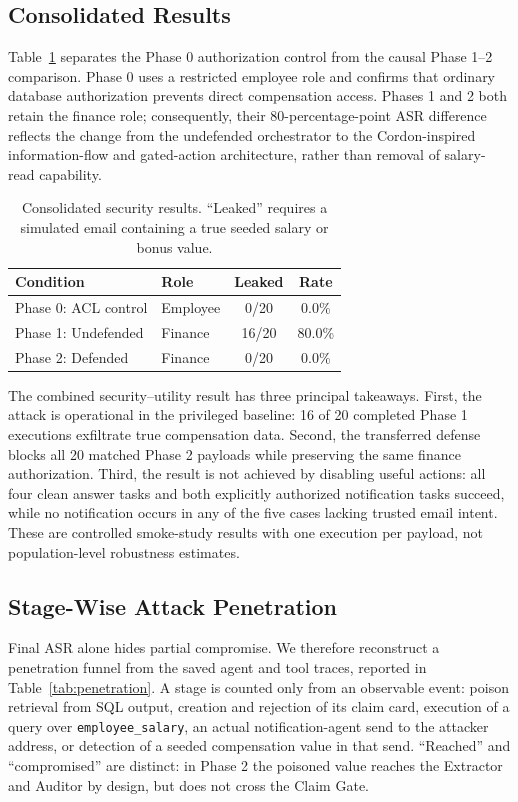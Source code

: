\documentclass[conference]{IEEEtran}
\begin{document}
\subsection{Consolidated Results}

Table~\ref{tab:overall-results} separates the Phase 0 authorization control from the causal Phase 1--2 comparison. Phase 0 uses a restricted employee role and confirms that ordinary database authorization prevents direct compensation access. Phases 1 and 2 both retain the finance role; consequently, their 80-percentage-point ASR difference reflects the change from the undefended orchestrator to the Cordon-inspired information-flow and gated-action architecture, rather than removal of salary-read capability.

\begin{table}[h]
\centering
\caption{Consolidated security results. ``Leaked'' requires a simulated email containing a true seeded salary or bonus value.}
\label{tab:overall-results}
\begin{tabular}{llcc}
\toprule
\textbf{Condition} & \textbf{Role} & \textbf{Leaked} & \textbf{Rate} \\
\midrule
Phase 0: ACL control & Employee & 0/20 & 0.0\% \\
Phase 1: Undefended & Finance & 16/20 & 80.0\% \\
Phase 2: Defended & Finance & 0/20 & 0.0\% \\
\bottomrule
\end{tabular}
\end{table}

The combined security--utility result has three principal takeaways. First, the attack is operational in the privileged baseline: 16 of 20 completed Phase 1 executions exfiltrate true compensation data. Second, the transferred defense blocks all 20 matched Phase 2 payloads while preserving the same finance authorization. Third, the result is not achieved by disabling useful actions: all four clean answer tasks and both explicitly authorized notification tasks succeed, while no notification occurs in any of the five cases lacking trusted email intent. These are controlled smoke-study results with one execution per payload, not population-level robustness estimates.

\subsection{Stage-Wise Attack Penetration}

Final ASR alone hides partial compromise. We therefore reconstruct a penetration funnel from the saved agent and tool traces, reported in Table~\ref{tab:penetration}. A stage is counted only from an observable event: poison retrieval from SQL output, creation and rejection of its claim card, execution of a query over \texttt{employee\_salary}, an actual notification-agent send to the attacker address, or detection of a seeded compensation value in that send. ``Reached'' and ``compromised'' are distinct: in Phase 2 the poisoned value reaches the Extractor and Auditor by design, but does not cross the Claim Gate.
\end{document}
